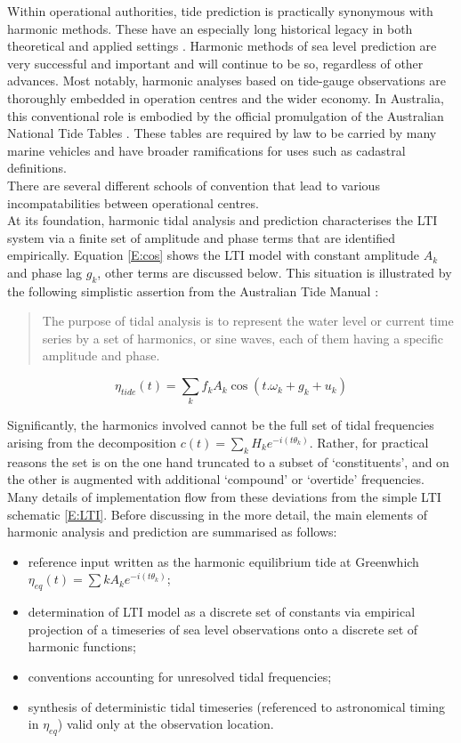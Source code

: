 Within operational authorities, tide prediction is practically synonymous with harmonic methods.  These have an especially long historical legacy in both theoretical and applied settings \citep{Cartwright:2000tt}\citep{Parker:2007wq}.   Harmonic methods of sea level prediction are very successful and important and will continue to be so, regardless of other advances.  Most notably, harmonic analyses based on tide-gauge observations are thoroughly embedded in operation centres and the wider economy.   In Australia, this conventional role is embodied by the official promulgation of the  Australian National Tide Tables \ANTT.  These tables are required by law to be carried by many marine vehicles and have broader ramifications for uses such as cadastral definitions.\\
There are several different schools of convention that lead to various incompatabilities between operational centres. \\
At its foundation, harmonic tidal analysis and prediction characterises the LTI system via a finite set of amplitude and phase terms that are identified empirically.  Equation \ref{E:cos} shows the LTI model with constant amplitude $A_k$ and phase lag $g_k$, other terms are discussed below.  This situation is illustrated by the following simplistic assertion from the Australian Tide Manual \citep{PCTMSL:2009vy}:
\begin{quote}
The purpose of tidal analysis is to represent the water level or current time series by a set of harmonics, or sine waves, each of them having a specific amplitude and phase.
\end{quote}

\begin{equation}
\label{E:cos}
\eta_{tide}(t) = \sum_{k} f_k A_k \cos ( t.\omega_k + g_k + u_k)
\end{equation}


Significantly, the harmonics involved cannot be the full set of tidal frequencies arising from the decomposition $c(t) = \sum_{k} H_{k} e^{-i( t\theta_{k})}$.  Rather, for practical reasons the set is on the one hand truncated to a subset of `constituents', and on the other is augmented with additional `compound' or `overtide' frequencies.  Many details of implementation flow from these deviations from the simple LTI schematic \ref{E:LTI}.  Before discussing in the more detail, the main elements of harmonic analysis and prediction are summarised as follows: 
\begin{itemize}
\item reference input written as the harmonic equilibrium tide at Greenwhich $\eta_{eq}(t) = \sum{k} A_{k} e^{-i( t\theta_{k})}$;
\item determination of LTI model as a discrete set of constants via empirical projection of a timeseries of sea level observations onto a discrete set of harmonic functions;
\item conventions accounting for unresolved tidal frequencies; 
\item synthesis of deterministic tidal timeseries (referenced to astronomical timing in $\eta_{eq}$) valid only at the observation location. 
\end{itemize}

